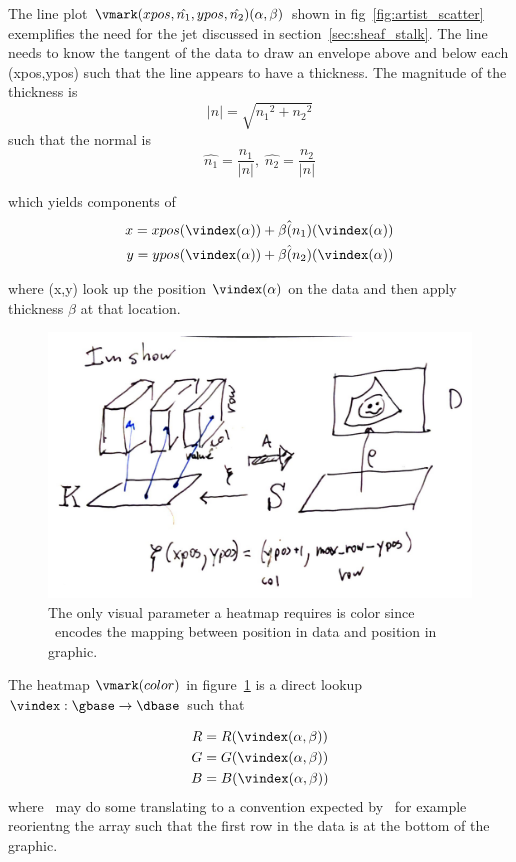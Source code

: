 \documentclass[../main.tex]{subfiles}
\begin{document}
The line plot $\vmark(xpos, \hat{n_{1}}, ypos, \hat{n_{2}})(\alpha, \beta)$ shown in fig~\ref{fig:artist_scatter} exemplifies the need for the jet discussed in section~\ref{sec:sheaf_stalk}. The line needs to know the tangent of the data to draw an envelope above and below each (xpos,ypos) such that the line appears to have a thickness. The magnitude of the thickness is 
\begin{equation}
    \lvert n \rvert = \sqrt{{n_{1}}^2 + {n_{2}}^2}
\end{equation}
such that the normal is  
\begin{equation}
    \hat{n_{1}} = \frac{n_1}{\lvert n \rvert}, \; \hat{n_{2}} = \frac{n_2}{\lvert n \rvert}
\end{equation}

which yields components of \gsection
\begin{align}
 x = xpos(\vindex(\alpha)) &+ \beta\hat(n_1)(\vindex(\alpha)) \\
 y = ypos(\vindex(\alpha)) &+ \beta\hat(n_2)(\vindex(\alpha)) 
\end{align}

where (x,y) look up the position $\vindex(\alpha)$ on the data and then apply thickness $\beta$ at that location. 


\begin{figure}[H]
    \includegraphics[width=.75\textwidth]{figures/math/heatmap.png}
    \caption{The only visual parameter a heatmap requires is color since \vindex\ encodes the mapping between position in data and position in graphic. }
    \label{fig:artist_heatmap}
\end{figure}

The heatmap $\vmark(color)$ in figure~\ref{fig:artist_heatmap} is a direct lookup $\vindex:\gbase\rightarrow\dbase$ such that 

\begin{align}
R &= R(\vindex(\alpha, \beta))\\
G &= G(\vindex(\alpha, \beta))\\
B &= B(\vindex(\alpha, \beta))
\end{align}
where \vindex\ may do some translating to a convention expected by \vmark\, for example reorientng the array such that the first row in the data is at the bottom of the graphic. 
\end{document}
